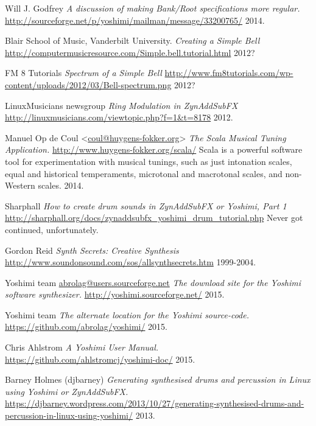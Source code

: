 \begin{thebibliography}{99}

   Will J. Godfrey
   \emph{A discussion of making Bank/Root specifications more regular.}
   \url{http://sourceforge.net/p/yoshimi/mailman/message/33200765/}
   2014.

   Blair School of Music, Vanderbilt University.
   \emph{Creating a Simple Bell}
   \url{http://computermusicresource.com/Simple.bell.tutorial.html}
   2012?

   FM 8 Tutorials
   \emph{Spectrum of a Simple Bell}
   \url{http://www.fm8tutorials.com/wp-content/uploads/2012/03/Bell-spectrum.png}
   2012?

   LinuxMusicians newsgroup
   \emph{Ring Modulation in ZynAddSubFX}
   \url{http://linuxmusicians.com/viewtopic.php?f=1&t=8178}
   2012.

   Manuel Op de Coul <\url{coul@huygens-fokker.org}>
   \emph{The Scala Musical Tuning Application.}
   \url{http://www.huygens-fokker.org/scala/}
   Scala is a powerful software tool for experimentation with musical
   tunings, such as just intonation scales, equal and historical
   temperaments, microtonal and macrotonal scales, and non-Western scales.
   2014.

   Sharphall
   \emph{How to create drum sounds in ZynAddSubFX or Yoshimi, Part 1}
   \url{http://sharphall.org/docs/zynaddsubfx\_yoshimi\_drum\_tutorial.php}
   Never got continued, unfortunately.

   Gordon Reid
   \emph{Synth Secrets:  Creative Synthesis}
   \url{http://www.soundonsound.com/sos/allsynthsecrets.htm}
   1999-2004.

   Yoshimi team \url{abrolag@users.sourceforge.net}
   \emph{The download site for the Yoshimi software synthesizer.}
   \url{http://yoshimi.sourceforge.net/}
   2015.

   Yoshimi team
   \emph{The alternate location for the Yoshimi source-code.}
   \url{https://github.com/abrolag/yoshimi/}
   2015.

   Chris Ahlstrom
   \emph{A Yoshimi User Manual.}
   \url{https://github.com/ahlstromcj/yoshimi-doc/}
   2015.
   
   Barney Holmes (djbarney)
   \emph{Generating synthesised drums and percussion in Linux using Yoshimi
   or ZynAddSubFX.}
   \url{https://djbarney.wordpress.com/2013/10/27/generating-synthesised-drums-and-percussion-in-linux-using-yoshimi/}
   2013.

\end{thebibliography}

